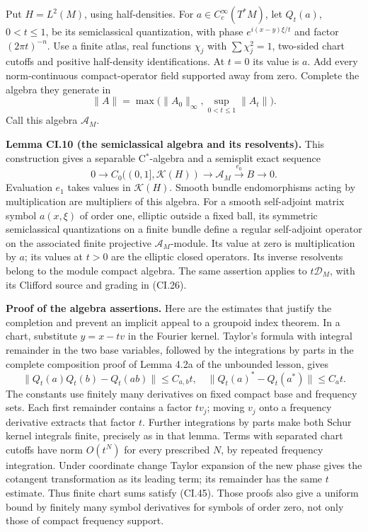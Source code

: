 \documentclass[
  11pt,
]{article}
\begin{document}
Put \(H=L^2(M)\), using half-densities. For \(a\in C_c^\infty(T^*M)\),
let \(Q_t(a)\), \(0<t\leq1\), be its semiclassical quantization, with
phase \(e^{i(x-y)\xi/t}\) and factor \((2\pi t)^{-n}\). Use a finite
atlas, real functions \(\chi_j\) with \(\sum\chi_j^2=1\), two-sided
chart cutoffs and positive half-density identifications. At \(t=0\) its
value is \(a\). Add every norm-continuous compact-operator field
supported away from zero. Complete the algebra they generate in \[
 \|A\|=\max\bigl(\|A_0\|_\infty,
                         \sup_{0<t\leq1}\|A_t\|\bigr).
 \tag{CI.43}
\] Call this algebra \(\mathcal A_M\).

\textbf{Lemma CI.10 (the semiclassical algebra and its resolvents).}
This construction gives a separable C\(^*\)-algebra and a semisplit
exact sequence \[
 0\longrightarrow C_0((0,1],\mathcal K(H))
 \longrightarrow\mathcal A_M\xrightarrow{e_0}B\longrightarrow0.
 \tag{CI.44}
\] Evaluation \(e_1\) takes values in \(\mathcal K(H)\). Smooth bundle
endomorphisms acting by multiplication are multipliers of this algebra.
For a smooth self-adjoint matrix symbol \(a(x,\xi)\) of order one,
elliptic outside a fixed ball, its symmetric semiclassical quantizations
on a finite bundle define a regular self-adjoint operator on the
associated finite projective \(\mathcal A_M\)-module. Its value at zero
is multiplication by \(a\); its values at \(t>0\) are the elliptic
closed operators. Its inverse resolvents belong to the module compact
algebra. The same assertion applies to \(t\mathscr D_M\), with its
Clifford source and grading in (CI.26).

\textbf{Proof of the algebra assertions.} Here are the estimates that
justify the completion and prevent an implicit appeal to a groupoid
index theorem. In a chart, substitute \(y=x-tv\) in the Fourier kernel.
Taylor's formula with integral remainder in the two base variables,
followed by the integrations by parts in the complete composition proof
of Lemma 4.2a of the unbounded lesson, gives \[
 \|Q_t(a)Q_t(b)-Q_t(ab)\|\leq C_{a,b}t,
 \quad \|Q_t(a)^*-Q_t(a^*)\|\leq C_at.
 \tag{CI.45}
\] The constants use finitely many derivatives on fixed compact base and
frequency sets. Each first remainder contains a factor \(tv_j\); moving
\(v_j\) onto a frequency derivative extracts that factor \(t\). Further
integrations by parts make both Schur kernel integrals finite, precisely
as in that lemma. Terms with separated chart cutoffs have norm
\(O(t^N)\) for every prescribed \(N\), by repeated frequency
integration. Under coordinate change Taylor expansion of the new phase
gives the cotangent transformation as its leading term; its remainder
has the same \(t\) estimate. Thus finite chart sums satisfy (CI.45).
Those proofs also give a uniform bound by finitely many symbol
derivatives for symbols of order zero, not only those of compact
frequency support.
\end{document}
